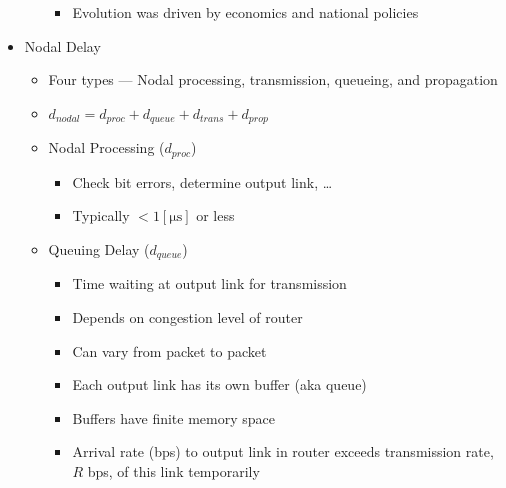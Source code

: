 \begin{itemize}
\begin{itemize}
        \begin{itemize}

          \item Evolution was driven by economics and national policies

        \end{itemize}

    \end{itemize}

  \item Nodal Delay

    \begin{itemize}

      \item Four types — Nodal processing, transmission, queueing, and propagation

      \item $d_{nodal}=d_{proc}+d_{queue}+d_{trans}+d_{prop}$

      \item Nodal Processing ($d_{proc}$)

        \begin{itemize}

          \item Check bit errors, determine output link, \ldots

          \item Typically $<1[\si{\micro\second}]$ or less

        \end{itemize}

      \item Queuing Delay ($d_{queue}$)

        \begin{itemize}

          \item Time waiting at output link for transmission

          \item Depends on congestion level of router

          \item Can vary from packet to packet

          \item Each output link has its own buffer (aka queue)

          \item Buffers have finite memory space

          \item Arrival rate (bps) to output link in router exceeds transmission rate, $R$ bps, of this link temporarily


\end{itemize}
\end{itemize}
\end{itemize}
